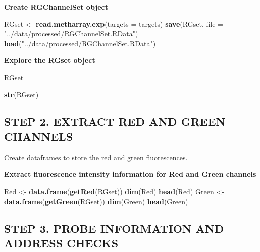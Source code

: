 \documentclass[
  11pt,
]{article}
\newenvironment{Shaded}{\begin{snugshade}}{\end{snugshade}}
\newcommand{\AttributeTok}[1]{\textcolor[rgb]{0.13,0.29,0.53}{#1}}
\newcommand{\FunctionTok}[1]{\textcolor[rgb]{0.13,0.29,0.53}{\textbf{#1}}}
\newcommand{\NormalTok}[1]{#1}
\newcommand{\OtherTok}[1]{\textcolor[rgb]{0.56,0.35,0.01}{#1}}
\newcommand{\StringTok}[1]{\textcolor[rgb]{0.31,0.60,0.02}{#1}}
\begin{document}
\textbf{Create RGChannelSet object}

\begin{Shaded}
\begin{Highlighting}[]
\NormalTok{RGset }\OtherTok{\textless{}{-}} \FunctionTok{read.metharray.exp}\NormalTok{(}\AttributeTok{targets =}\NormalTok{ targets)}
\FunctionTok{save}\NormalTok{(RGset, }\AttributeTok{file =} \StringTok{"../data/processed/RGChannelSet.RData"}\NormalTok{)}
\FunctionTok{load}\NormalTok{(}\StringTok{"../data/processed/RGChannelSet.RData"}\NormalTok{)}
\end{Highlighting}
\end{Shaded}

\textbf{Explore the RGset object}

\begin{Shaded}
\begin{Highlighting}[]
\NormalTok{RGset}
\end{Highlighting}
\end{Shaded}

\begin{Shaded}
\begin{Highlighting}[]
\FunctionTok{str}\NormalTok{(RGset)}
\end{Highlighting}
\end{Shaded}

\subsection{STEP 2. EXTRACT RED AND GREEN
CHANNELS}\label{step-2.-extract-red-and-green-channels}

Create dataframes to store the red and green fluorescences.

\textbf{Extract fluorescence intensity information for Red and Green
channels}

\begin{Shaded}
\begin{Highlighting}[]
\NormalTok{Red }\OtherTok{\textless{}{-}} \FunctionTok{data.frame}\NormalTok{(}\FunctionTok{getRed}\NormalTok{(RGset))}
\FunctionTok{dim}\NormalTok{(Red)}
\FunctionTok{head}\NormalTok{(Red)}
\NormalTok{Green }\OtherTok{\textless{}{-}} \FunctionTok{data.frame}\NormalTok{(}\FunctionTok{getGreen}\NormalTok{(RGset))}
\FunctionTok{dim}\NormalTok{(Green)}
\FunctionTok{head}\NormalTok{(Green)}
\end{Highlighting}
\end{Shaded}

\subsection{STEP 3. PROBE INFORMATION AND ADDRESS
CHECKS}\label{step-3.-probe-information-and-address-checks}
\end{document}
